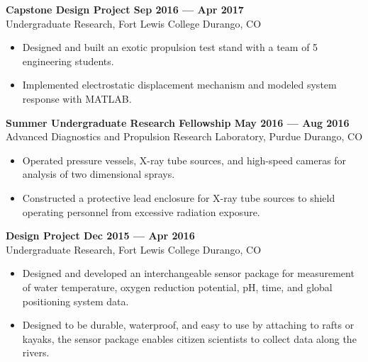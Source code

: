 \textbf{Capstone Design Project \hfill Sep 2016 --- Apr 2017}\\
Undergraduate Research, Fort Lewis College \hfill Durango, CO

\begin{itemize}
    \item Designed and built an exotic propulsion test stand with a team of 5 engineering students.
    \item Implemented electrostatic displacement mechanism and modeled system response with MATLAB.
\end{itemize}

\textbf{Summer Undergraduate Research Fellowship \hfill May 2016 --- Aug 2016}\\
Advanced Diagnostics and Propulsion Research Laboratory, Purdue \hfill Durango, CO

\begin{itemize}
    \item Operated pressure vessels, X-ray tube sources, and high-speed cameras for analysis of two dimensional sprays.
    \item Constructed a protective lead enclosure for X-ray tube sources to shield operating personnel from excessive radiation exposure.
\end{itemize}

\textbf{Design Project \hfill Dec 2015 --- Apr 2016}\\
Undergraduate Research, Fort Lewis College \hfill Durango, CO

\begin{itemize}
    \item Designed and developed an interchangeable sensor package for measurement of water temperature, oxygen reduction potential, pH, time, and global positioning system data.
    \item Designed to be durable, waterproof, and easy to use by attaching to rafts or kayaks, the sensor package enables citizen scientists to collect data along the rivers.
\end{itemize}
